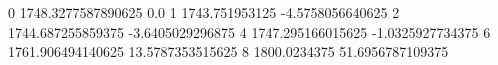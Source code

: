 0 1748.3277587890625 0.0
1 1743.751953125 -4.5758056640625
2 1744.687255859375 -3.6405029296875
4 1747.295166015625 -1.0325927734375
6 1761.906494140625 13.5787353515625
8 1800.0234375 51.6956787109375
